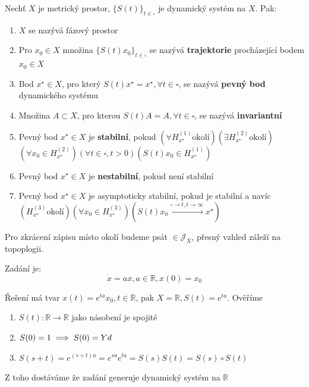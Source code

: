 \documentclass[../main.tex]{subfiles}
\begin{document}
\begin{definition}
    Nechť $X$ je metrický prostor, 
    $\{S(t)\}_{t\in\square}$ je dynamický systém na $X$.
    Pak: 
    \begin{enumerate}
        \item $X$ se nazývá fázový prostor 
        \item Pro $x_0 \in X $ množina $\{S(t)x_0\}_{t\in\square}$ se nazývá \textbf{trajektorie} procházející bodem $x_0 \in X$
        \item Bod $x^\star \in X$, pro který $S(t)x^\star = x^\star, \forall t\in \square$, se nazývá \textbf{pevný bod} dynamického systému
        \item Množina $A\subset X$, pro kterou $S(t)A=A, \forall t \in \square$, se nazývá \textbf{invariantní}
        \item Pevný bod $x^\star\in X$ je \textbf{stabilní}, pokud $\left(\forall H^{(1)}_{x^\star} \text{okolí}\right)\left(\exists H^{(2)}_{x^\star} \text{okolí}\right)$\break
        $\left(\forall x_0\in H^{(2)}_{x^\star}\right)\left(\forall t \in \square, t>0\right)\left(S(t)x_0\in H^{(1)}_{x^\star}\right)$
        \item Pevný bod $x^\star \in X$ je \textbf{nestabilní}, pokud není stabilní
        \item Pevný bod $x^\star \in X$ je asymptoticky stabilní, pokud je stabilní a navíc $\left(H^{(3)}_{x^\star} \text{okolí}\right)\left(\forall x_0 \in H^{(3)}_{x^\star}\right)\left(S(t)x_0 \overset{\square \rightarrow t, t \rightarrow \infty}{\longrightarrow} x^\star\right)$
    \end{enumerate}
\end{definition}

\begin{definition}
    Pro zkrácení zápisu místo okolí budeme psát $\in \mathcal{J}_X$, přesný vzhled záleží na topoplogii.
\end{definition}


\begin{example}
    Zadání je:
    \begin{equation}
        \dot{x} = ax, a\in \mathbb{R}, x(0)= x_0
    \end{equation}

    Řešení má tvar $x(t) = e^{ta}x_0, t\in \mathbb{R}$, pak $X=\mathbb{R}, S(t) = e^{ta}$. Ověříme 
    \begin{enumerate}
        \item $S(t): \mathbb{R} \rightarrow \mathbb{R}$ jako násobení je spojité 
        \item $S(0)=1 \implies S(0) = Yd$
        \item $S(s+t) = e^{(s+t)a} = e^{sa}e^{ta}= S(s)S(t) = S(s)\circ S(t)$
    \end{enumerate}

    Z toho dostáváme že zadání generuje dynamický systém na $\mathbb{R}$
\end{example}
\end{document}
